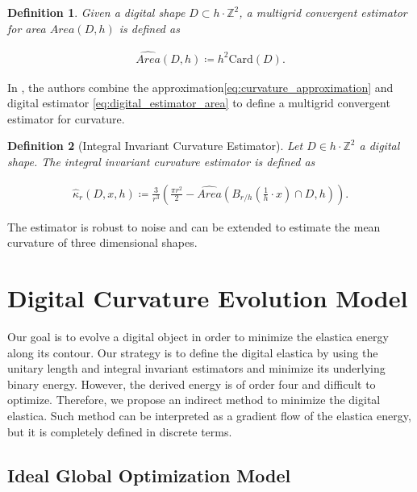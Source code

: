 \documentclass[runningheads]{llncs}
\newtheorem{ddef}{Definition}
\begin{document}
	\begin{ddef}	
		Given a digital shape $D \subset h \cdot \mathbb{Z}^2$, a multigrid convergent estimator for area $\widehat{Area}(D,h)$ is defined as	
		
		\begin{align}
			\widehat{Area}(D,h) \coloneqq h^2\text{Card}\left( D \right).			
			\label{eq:digital_estimator_area}
		\end{align}

	\end{ddef}
	
	In \cite{coeurjolly13}, the authors combine the approximation\eqref{eq:curvature_approximation} and digital estimator \eqref{eq:digital_estimator_area} to define a multigrid convergent estimator for curvature.

	\begin{ddef}[Integral Invariant Curvature Estimator]
		Let $D \in h \cdot \mathbb{Z}^2$ a digital shape. The integral invariant curvature estimator is defined as
		
		\begin{align*}
			\hat{\kappa}_{r}(D,x,h) \coloneqq \frac{3}{r^3} \left( \frac{\pi r^2}{2} - \widehat{Area} \left( B_{r/h} ( \frac{1}{h} \cdot x ) \cap D, h \right) \right).
		\end{align*}
	\end{ddef}
	

	The estimator is robust to noise and can be extended to estimate the mean curvature of three dimensional shapes.
	

\section{Digital Curvature Evolution Model}


Our goal is to evolve a digital object in order to minimize the elastica energy along its contour. Our strategy is to define the digital elastica by using the unitary length and integral invariant estimators and minimize its underlying binary energy. However, the derived energy is of order four and difficult to optimize. Therefore, we propose an indirect method to minimize the digital elastica. Such method can be interpreted as a gradient flow of the elastica energy, but it is completely defined in discrete terms.




\subsection{Ideal Global Optimization Model}
\end{document}
